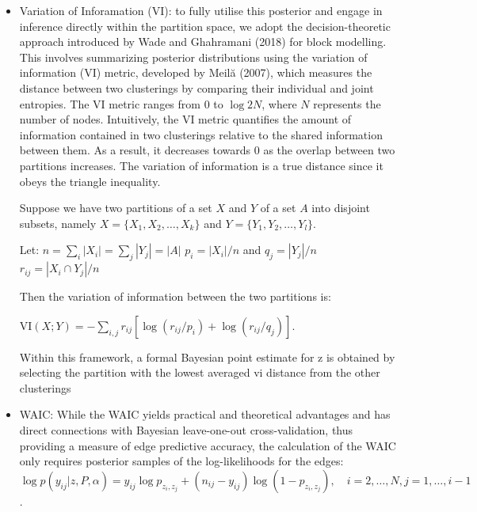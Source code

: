\documentclass[11pt]{amsart}
\begin{document}
\begin{itemize}
\item Variation of Inforamation (VI): to fully utilise this posterior and engage in inference directly within the partition space, we adopt the decision-theoretic approach introduced by Wade and Ghahramani (2018) for block modelling. This involves summarizing posterior distributions using the variation of information (VI) metric, developed by Meilă (2007), which measures the distance between two clusterings by comparing their individual and joint entropies. The VI metric ranges from 0 to $\log 2 N$, where $N$ represents the number of nodes. Intuitively, the VI metric quantifies the amount of information contained in two clusterings relative to the shared information between them. As a result, it decreases towards 0 as the overlap between two partitions increases. 
The variation of information is a true distance since  it obeys the triangle inequality.

Suppose we have two partitions of a set $X$ and $Y$ of a set $A$ into disjoint subsets, namely  $X = \{X_{1}, X_{2}, \ldots, X_{k}\}$ and $Y = \{Y_{1}, Y_{2}, \ldots, Y_{l}\}$. 

Let:
$n = \sum_{i} |X_{i}| = \sum_{j} |Y_{j}|=|A|$
$p_{i} = |X_{i}| / n$ and $q_{j} = |Y_{j}| / n $
$r_{ij} = |X_i\cap Y_{j}| / n$

Then the variation of information between the two partitions is:

$\mathrm{VI}(X; Y ) = - \sum_{i,j} r_{ij} \left[\log(r_{ij}/p_i)+\log(r_{ij}/q_j) \right]$.


Within this framework, a formal Bayesian point estimate for z is obtained by selecting the partition with the lowest averaged vi distance from the other clusterings
\item WAIC: While the WAIC yields practical and theoretical advantages  and has direct connections with Bayesian leave-one-out cross-validation, thus providing a measure of edge predictive accuracy, the calculation of the WAIC only requires posterior samples of the log-likelihoods for the edges:$
\log p(y_{ij} | z, P, \alpha) = y_{ij} \log p_{z_i, z_j} + (n_{ij}- y_{ij}) \log(1 - p_{z_i, z_j}), \quad i = 2, \ldots, N,  j = 1, \ldots, i - 1$.


\end{itemize}
\end{document}
